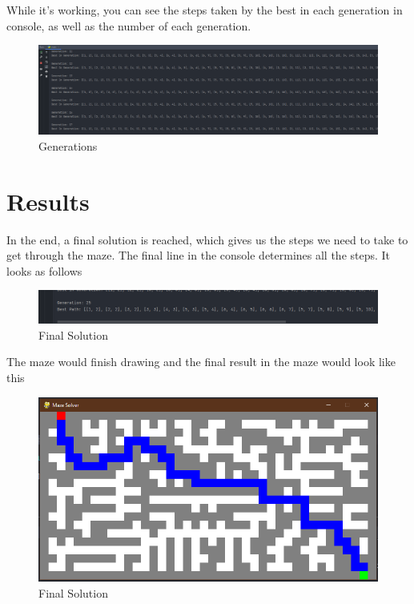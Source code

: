 \documentclass{article}
\begin{document}
While it's working, you can see the steps taken by the best in each generation in console, as well as the number of each generation.

\begin{figure}[htb!]
\centerline
{\includegraphics[width=130mm,scale=1.0]{generations.png}}
\caption{Generations}
\end{figure}
\newpage

\section{Results}
In the end, a final solution is reached, which gives us the steps we need to take to get through the maze. The final line in the console determines all the steps. It looks as follows

\begin{figure}[htb!]
\centerline
{\includegraphics[width=130mm,scale=1.0]{finalsolution.png}}
\caption{Final Solution}
\end{figure}

The maze would finish drawing and the final result in the maze would look like this

\begin{figure}[htb!]
\centerline
{\includegraphics[width=130mm,scale=1.0]{mazefinal.png}}
\caption{Final Solution}
\end{figure}
\newpage
\end{document}
